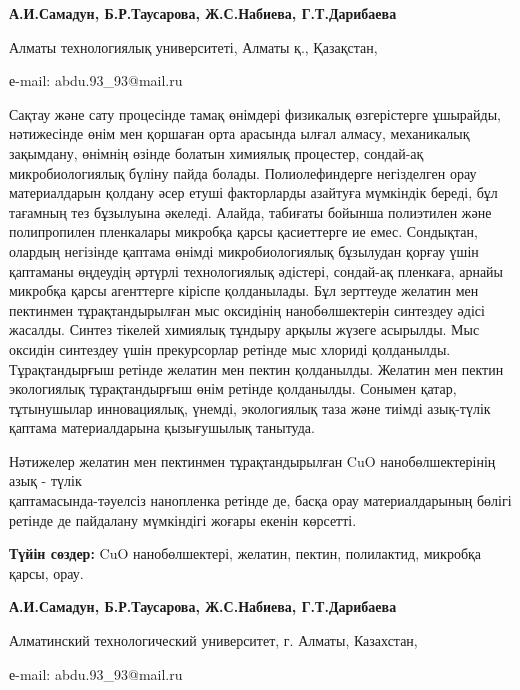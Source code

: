 \begin{center}
{\bfseries А.И.Самадун, Б.Р.Таусарова, Ж.С.Набиева, Г.Т.Дарибаева}

Алматы технологиялық университеті, Алматы қ., Қазақстан,

е-mail: abdu.93\_93@mail.ru
\end{center}

Сақтау және сату процесінде тамақ өнімдері физикалық өзгерістерге
ұшырайды, нәтижесінде өнім мен қоршаған орта арасында ылғал алмасу,
механикалық зақымдану, өнімнің өзінде болатын химиялық процестер,
сондай-ақ микробиологиялық бүліну пайда болады. Полиолефиндерге
негізделген орау материалдарын қолдану әсер етуші факторларды азайтуға
мүмкіндік береді, бұл тағамның тез бұзылуына әкеледі. Алайда, табиғаты
бойынша полиэтилен және полипропилен пленкалары микробқа қарсы
қасиеттерге ие емес. Сондықтан, олардың негізінде қаптама өнімді
микробиологиялық бұзылудан қорғау үшін қаптаманы өңдеудің әртүрлі
технологиялық әдістері, сондай-ақ пленкаға, арнайы микробқа қарсы
агенттерге кіріспе қолданылады. Бұл зерттеуде желатин мен пектинмен
тұрақтандырылған мыс оксидінің нанобөлшектерін синтездеу әдісі жасалды.
Синтез тікелей химиялық тұндыру арқылы жүзеге асырылды. Мыс оксидін
синтездеу үшін прекурсорлар ретінде мыс хлориді қолданылды.
Тұрақтандырғыш ретінде желатин мен пектин қолданылды. Желатин мен пектин
экологиялық тұрақтандырғыш өнім ретінде қолданылды. Сонымен қатар,
тұтынушылар инновациялық, үнемді, экологиялық таза және тиімді
азық-түлік қаптама материалдарына қызығушылық танытуда.

Нәтижелер желатин мен пектинмен тұрақтандырылған CuO нанобөлшектерінің
азық - түлік \\қаптамасында-тәуелсіз нанопленка ретінде де, басқа орау
материалдарының бөлігі ретінде де пайдалану мүмкіндігі жоғары екенін
көрсетті.

{\bfseries Түйін сөздер:} CuO нанобөлшектері, желатин, пектин, полилактид,
микробқа қарсы, орау.


\begin{center}
{\bfseries А.И.Самадун, Б.Р.Таусарова, Ж.С.Набиева, Г.Т.Дарибаева}

Алматинский технологический университет, г. Алматы, Казахстан,

е-mail: abdu.93\_93@mail.ru
\end{center}

